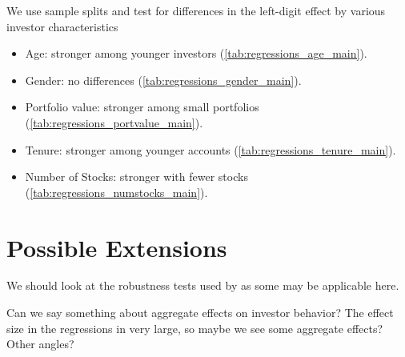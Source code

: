 We use sample splits and test for differences in the left-digit effect by various investor characteristics
\begin{itemize}
	\item Age: stronger among younger investors (\ref{tab:regressions_age_main}).
	\item Gender: no differences (\ref{tab:regressions_gender_main}).
	\item Portfolio value: stronger among small portfolios (\ref{tab:regressions_portvalue_main}).
	\item Tenure: stronger among younger accounts (\ref{tab:regressions_tenure_main}).
	\item Number of Stocks: stronger with fewer stocks (\ref{tab:regressions_numstocks_main}).
\end{itemize}

\section{Possible Extensions}

We should look at the robustness tests used by \cite{hartzmark2015} as some may be applicable here.

Can we say something about aggregate effects on investor behavior? The effect size in the regressions in very large, so maybe we see some aggregate effects? Other angles? \\




